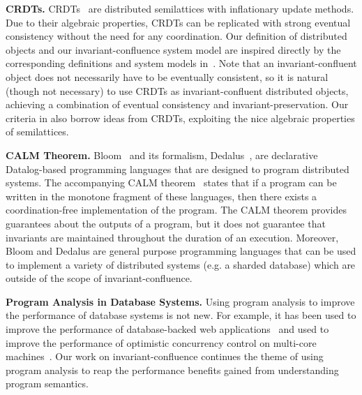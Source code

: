 \textbf{CRDTs.}
CRDTs~\cite{shapiro2011conflict, shapiro2011comprehensive} are distributed
semilattices with inflationary update methods. Due to their algebraic
properties, CRDTs can be replicated with strong eventual consistency without
the need for any coordination. Our definition of distributed objects and our
invariant-confluence system model are inspired directly by the corresponding
definitions and system models in~\cite{shapiro2011conflict}. Note that an
invariant-confluent object does not necessarily have to be eventually
consistent, so it is natural (though not necessary) to use CRDTs as
invariant-confluent distributed objects, achieving a combination of eventual
consistency and invariant-preservation. Our criteria in
 also borrow ideas from CRDTs, exploiting the nice
algebraic properties of semilattices.

\textbf{CALM Theorem.}
Bloom~\cite{alvaro2010boom, alvaro2011consistency, conway2012logic} and its
formalism, Dedalus~\cite{alvaro2011dedalus, alvaro2013declarative}, are
declarative Datalog-based programming languages that are designed to program
distributed systems. The accompanying CALM
theorem~\cite{hellerstein2010declarative, ameloot2013relational} states that if
a program can be written in the monotone fragment of these languages, then
there exists a coordination-free implementation of the program.
The CALM theorem provides guarantees about the outputs of a program, but it
does not guarantee that invariants are maintained throughout the duration of an
execution. Moreover, Bloom and Dedalus are general purpose programming
languages that can be used to implement a variety of distributed systems (e.g.
a sharded database) which are outside of the scope of invariant-confluence.

\textbf{Program Analysis in Database Systems.}
Using program analysis to improve the performance of database systems is not
new. For example, it has been used to improve the performance of
database-backed web applications~\cite{cheung2014using, wu2016transaction,
ramachandra2012program} and used to improve the performance of optimistic
concurrency control on multi-core machines~\cite{wu2016transaction}. Our work
on invariant-confluence continues the theme of using program analysis to reap
the performance benefits gained from understanding program semantics.

